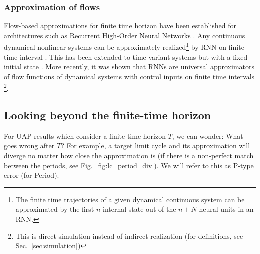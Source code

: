\documentclass{article}
\newcommand{\reals}{\mathbb{R}}
\newcounter{ct}
\begin{document}




\subsubsection{Approximation of flows}%
Flow-based approximations for finite time horizon have been established for architectures such as Recurrent High-Order Neural Networks  \citep{kosmatopoulos1995structural}.
Any continuous dynamical nonlinear systems can be approximately realized\footnote{The finite time trajectories of a given dynamical continuous system can be approximated by the first $n$ internal state out of the $n + N$ neural units in an RNN.} by RNN on finite time interval  \citep{chow2000modeling}.
%
This has been extended to time-variant systems but with a fixed initial state  \citep{li2005approximation}. %
%
More recently, it was shown that RNNs are universal approximators of flow functions of dynamical systems  with control inputs on finite time intervals   \citep{aguiar2023universal}\footnote{This is direct simulation instead of indirect realization (for definitions, see Sec.~\ref{sec:simulation})}. %



\subsection{Looking beyond the finite-time horizon}\label{sec:beyondfinitetime}

For UAP results which consider a finite-time horizon $T$, we can wonder: What goes wrong after $T$?
%
For example, a target limit cycle and its approximation will diverge no matter how close the approximation is (if there is a non-perfect match between the periods, see Fig.~\ref{fig:lc_period_div}).
We will refer to this as P-type error (for Period).
\end{document}
